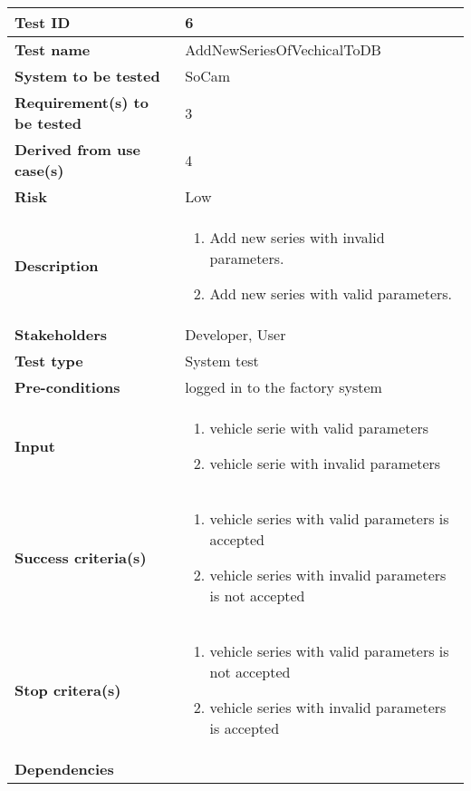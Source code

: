				\begin{table}[H]
			\begin{tabular}{| p{4cm} | p{10cm} |}
			\hline
			\rowcolor{gray}
				{\bf Test ID} & 6 \\ \hline
				{\bf Test name} & AddNewSeriesOfVechicalToDB \\ \hline
				{\bf System to be tested} & SoCam \\ \hline
				{\bf Requirement(s) to be tested} & 3 \\ \hline
				{\bf Derived from use case(s)} & 4 \\ \hline
				{\bf Risk} & Low \\  \hline
				{\bf Description} & 
					\begin{enumerate}
						\item Add new series with invalid parameters.
						\item Add new series with valid parameters.
					\end{enumerate}
				\\ \hline
				{\bf Stakeholders} & Developer, User \\ \hline
				{\bf Test type} & System test \\ \hline
				{\bf Pre-conditions} & logged in to the factory system \\ \hline
				{\bf Input} & 
					\begin{enumerate}
						\item vehicle serie with valid parameters
						\item vehicle serie with invalid parameters
					\end{enumerate}
				\\ \hline
				{\bf Success criteria(s)} & 
					\begin{enumerate}
						\item vehicle series with valid parameters is accepted
						\item vehicle series with invalid parameters is not accepted
					\end{enumerate}
				\\ \hline
				{\bf Stop critera(s)} &  
					\begin{enumerate}
						\item vehicle series with valid parameters is not accepted
						\item vehicle series with invalid parameters is accepted
					\end{enumerate} \\ \hline
				{\bf Dependencies} & \\ \hline
			\end{tabular}
		\end{table}


